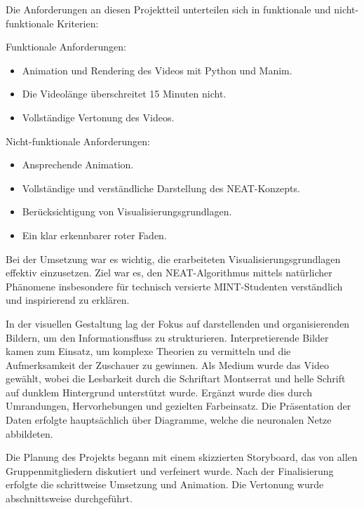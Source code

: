 Die Anforderungen an diesen Projektteil unterteilen sich in funktionale und nicht-funktionale Kriterien:

Funktionale Anforderungen:
\begin{itemize}
	\item Animation und Rendering des Videos mit Python und Manim.
	\item Die Videolänge überschreitet 15 Minuten nicht.
	\item Vollständige Vertonung des Videos.
\end{itemize}

Nicht-funktionale Anforderungen:
\begin{itemize}
	\item Ansprechende Animation.
	\item Vollständige und verständliche Darstellung des NEAT-Konzepts.
	\item Berücksichtigung von Visualisierungsgrundlagen.
	\item Ein klar erkennbarer roter Faden.
\end{itemize}

Bei der Umsetzung war es wichtig, die erarbeiteten Visualisierungsgrundlagen effektiv einzusetzen. Ziel war es, den NEAT-Algorithmus mittels natürlicher Phänomene insbesondere für technisch versierte MINT-Studenten verständlich und inspirierend zu erklären.

In der visuellen Gestaltung lag der Fokus auf darstellenden und organisierenden Bildern, um den Informationsfluss zu strukturieren. Interpretierende Bilder kamen zum Einsatz, um komplexe Theorien zu vermitteln und die Aufmerksamkeit der Zuschauer zu gewinnen. Als Medium wurde das Video gewählt, wobei die Lesbarkeit durch die Schriftart Montserrat und helle Schrift auf dunklem Hintergrund unterstützt wurde. Ergänzt wurde dies durch Umrandungen, Hervorhebungen und gezielten Farbeinsatz. Die Präsentation der Daten erfolgte hauptsächlich über Diagramme, welche die neuronalen Netze abbildeten.

Die Planung des Projekts begann mit einem skizzierten Storyboard, das von allen Gruppenmitgliedern diskutiert und verfeinert wurde. Nach der Finalisierung erfolgte die schrittweise Umsetzung und Animation. Die Vertonung wurde abschnittsweise durchgeführt.

 